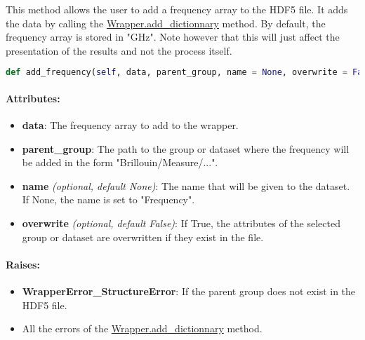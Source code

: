 This method allows the user to add a frequency array to the HDF5 file. It adds the data by calling the \hyperref[subsec:wrapper.add_dictionnary]{Wrapper.add\_dictionnary} method.
By default, the frequency array is stored in "GHz". Note however that this will just affect the presentation of the results and not the process itself.

\begin{lstlisting}[language=Python]
def add_frequency(self, data, parent_group, name = None, overwrite = False):
\end{lstlisting}

\paragraph{Attributes:}

\begin{itemize}
    \item \textbf{data}: The frequency array to add to the wrapper. 
    \item \textbf{parent\_group}: The path to the group or dataset where the frequency will be added in the form "Brillouin/Measure/...".
    \item \textbf{name} \textit{(optional, default None)}: The name that will be given to the dataset. If None, the name is set to "Frequency".
    \item \textbf{overwrite} \textit{(optional, default False)}: If True, the attributes of the selected group or dataset are overwritten if they exist in the file.
\end{itemize}

\paragraph{Raises:}
\begin{itemize}
    \item \textbf{WrapperError\_StructureError}: If the parent group does not exist in the HDF5 file.
    \item All the errors of the \hyperref[subsec:wrapper.add_dictionnary]{Wrapper.add\_dictionnary} method.
\end{itemize}
